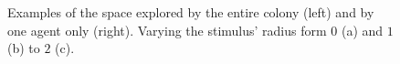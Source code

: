 \begin{figure}[H]
\myfloatalign
{} \quad
{} \quad
{}

\caption{Examples of the space explored by the entire colony (left) and by one agent only (right). Varying the stimulus' radius form $0$ (a) and $1$ (b) to $2$ (c).}\label{fig:radius-explored}
\end{figure}


